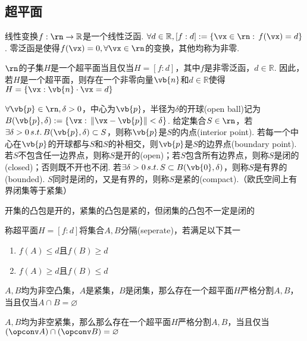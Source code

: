 \subsection{超平面}
\begin{definition}
线性变换$f:\rn\to\mathbb{R}$是一个线性泛函. $\forall d\in\mathbb{R},[f:d]:=\{\vx\in\rn:\,f(\vx)=d\}$. 零泛函是使得$f(\vx)=0,\forall\vx\in\rn$的变换，其他均称为非零.
\end{definition}
\begin{theorem}
$\rn$的子集$H$是一个超平面当且仅当$H=[f:d]$，其中$f$是非零泛函，$d\in\mathbb{R}$. 因此，若$H$是一个超平面，则存在一个非零向量$\vb{n}$和$d\in\mathbb{R}$使得$H=\{\vx:\vb{n}\cdot\vx=d\}$
\end{theorem}
\begin{definition}[拓扑概念]
\rm $\forall\vb{p}\in\rn,\delta>0$，中心为$\vb{p}$，半径为$\delta$的开球(open ball)记为$B(\vb{p},\delta):=\{\vx:\,\|\vx-\vb{p}\|<\delta\}$. 给定集合$S\in\rn$，若$\exists\delta>0\,s.t.\,B(\vb{p},\delta)\subset S$，则称$\vb{p}$是$S$的内点(interior point). 若每一个中心在$\vb{p}$的开球都与$S$和$S$的补相交，则$\vb{p}$是$S$的边界点(boundary point). 若$S$不包含任一边界点，则称$S$是开的(open)；若$S$包含所有边界点，则称$S$是闭的(closed)；否则既不开也不闭. 若$\exists\delta>0\,s.t.\,S\subset B(\vb{0},\delta)$，则称$S$是有界的(bounded). $S$同时是闭的，又是有界的，则称$S$是紧的(compact).（欧氏空间上有界闭集等于紧集）
\end{definition}
\begin{theorem}
开集的凸包是开的，紧集的凸包是紧的，但闭集的凸包不一定是闭的
\end{theorem}
\begin{definition}
\rm 称超平面$H=[f:d]$将集合$A,B$分隔(seperate)，若满足以下其一
\begin{enumerate}
	\itemsep -3pt
	\item $f(A)\leq d$且$f(B)\geq d$
	\item $f(A)\geq d$且$f(B)\leq d$
\end{enumerate}
\end{definition}
\begin{theorem}
$A,B$均为非空凸集，$A$是紧集，$B$是闭集，那么存在一个超平面$H$严格分割$A,B$，当且仅当$A\cap B=\varnothing$
\end{theorem}
\begin{theorem}
$A,B$均为非空紧集，那么那么存在一个超平面$H$严格分割$A,B$，当且仅当$(\opconv A)\cap (\opconv B)=\varnothing$
\end{theorem}

